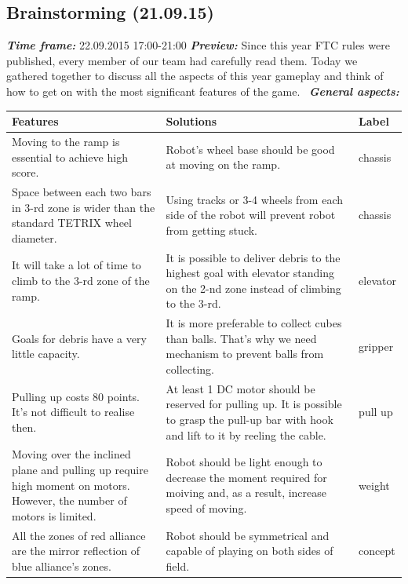 \subsection{Brainstorming (21.09.15)}
	\textit{\textbf{Time frame:}} 22.09.2015 17:00-21:00 \newline
	\textit{\textbf{Preview:}} Since this year FTC rules were published, every member of our team had carefully read them. Today we gathered together to discuss all the aspects of this year gameplay and think of how to get on with the most significant features of the game. \newline \newline
	\textit{\textbf{General aspects:}}
	\begin{table}[H]
		\vspace{-2mm}
		\begin{center}
			\begin{tabular}{|p{0.4\linewidth}|p{0.5\linewidth}|p{0.1\linewidth}|}
				\hline
				Features & Solutions & Label \\
				\hline
				Moving to the ramp is essential to achieve high score. & Robot's wheel base should be good at moving on the ramp. & chassis \\
				\hline
				Space between each two bars in 3-rd zone is wider than the standard TETRIX wheel diameter. & Using tracks or 3-4 wheels from each side of the robot will prevent robot from getting stuck. & chassis \\
				\hline
				It will take a lot of time to climb to the 3-rd zone of the ramp. & It is possible to deliver debris to the highest goal with elevator standing on the 2-nd zone instead of climbing to the 3-rd. & elevator \\
				\hline
				Goals for debris have a very little capacity. & It is more preferable to collect cubes than balls. That's why we need mechanism to prevent balls from collecting. & gripper \\
				\hline
				Pulling up costs 80 points. It's not difficult to realise then. & At least 1 DC motor should be reserved for pulling up. It is possible to grasp the pull-up bar with hook and lift to it by reeling the cable. & pull up \\
				\hline
				Moving over the inclined plane and pulling up require high moment on motors. However, the number of motors is limited. & Robot should be light enough to decrease the moment required for moiving and, as a result, increase speed of moving. & weight \\
				\hline
				All the zones of red alliance are the mirror reflection of blue alliance's zones. & Robot should be symmetrical and capable of playing on both sides of field. & concept \\

\end{tabular}
\end{center}
\end{table}
